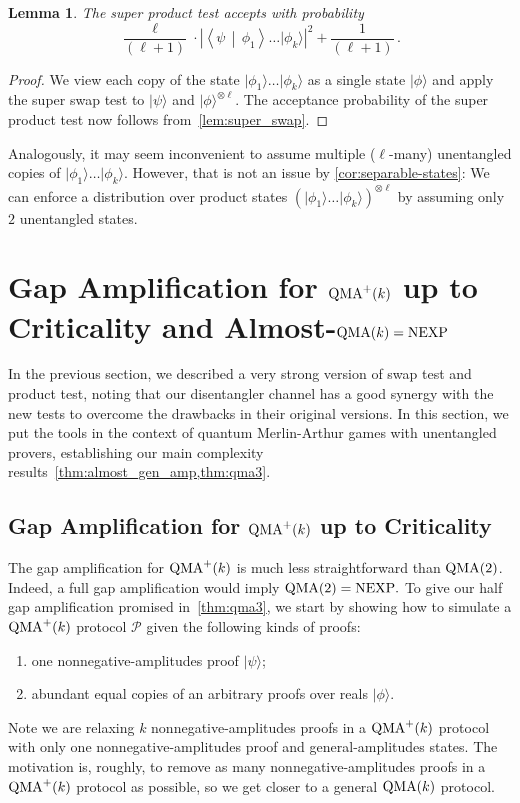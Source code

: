 \documentclass[10pt,a4paper]{article}
\newtheorem{lemma}[theorem]{Lemma}
\theoremstyle{remark}
\def\cal{\mathcal}
\newcommand{\mper}{\,.}
\newcommand{\abs}[1]{\ensuremath{\left\lvert #1 \right\rvert}}
\newcommand{\calP}{{\cal P}}
\newcommand{\1}[1]{\mathds{1}{[#1]}}
\newcommand{\ket}[1]{\lvert #1\rangle}
\newcommand{\braket}[2]{\left\langle #1 \,\middle\vert\, #2\right\rangle}
\newcommand{\QMA}{\textup{QMA}}
\newcommand{\NEXP}{\textup{NEXP}}
\numberwithin{equation}{section}
\begin{document}
\begin{lemma}
  The super product test accepts with probability
    \[ 
  \frac{\ell}{(\ell+1)} \cdot \abs{\braket{\psi}{\phi_1}\ldots\ket{\phi_k}}^2 + \frac{1}{(\ell+1)}\mper
    \] 
\end{lemma}

\begin{proof}
  We view each copy of the state $\ket{\phi_1}\ldots\ket{\phi_k}$ as a single state $\ket{\phi}$
  and apply the super swap test to $\ket{\psi}$ and $\ket{\phi}^{\otimes \ell}$. The acceptance  
  probability of the super product test now follows from~\cref{lem:super_swap}.
\end{proof}

Analogously, it may seem inconvenient to assume multiple ($\ell$-many) unentangled copies of $\ket{\phi_1} \ldots \ket{\phi_k}$.
However, that is not an issue by \cref{cor:separable-states}: We can enforce a distribution over product states $(\ket{\phi_1} \ldots \ket{\phi_k})^{\otimes \ell}$ by assuming only $2$ unentangled states. 

\section{Gap Amplification for $\QMA^+(k)$ up to Criticality and Almost-$\QMA(k)=\NEXP$}\label{sec:protocol}

In the previous section, we described a very strong version of swap test and product test, noting that our disentangler channel has a good synergy with the new tests to overcome the drawbacks in their original versions.
%
In this section, we put the tools in the context of quantum Merlin-Arthur games with unentangled provers,
establishing our main complexity results~\cref{thm:almost_gen_amp,thm:qma3}.

\subsection{Gap Amplification for $\QMA^+(k)$ up to Criticality}

The gap amplification for $\QMA^+(k)$ is much less straightforward than $\QMA(2)$.
%
Indeed, a full gap amplification would imply $\QMA(2) = \NEXP.$
%
To give our half gap amplification promised in~\cref{thm:qma3}, we start by showing how to
simulate a $\QMA^+(k)$ protocol $\calP$ given the following kinds of proofs:
\begin{enumerate}
    \item\label{enu:nonnegative-state} one nonnegative-amplitudes proof $\ket{\psi}$;
    \item\label{enu:many-general-states} abundant equal copies of an arbitrary proofs over reals $\ket{\phi}$.
\end{enumerate}   
Note we are relaxing $k$ nonnegative-amplitudes proofs in a $\QMA^+(k)$ protocol with only one nonnegative-amplitudes
proof and general-amplitudes states.
%
The motivation is, roughly, to remove as many nonnegative-amplitudes proofs in a $\QMA^+(k)$ protocol as possible, so we get
closer to a general $\QMA(k)$ protocol. 
\end{document}
